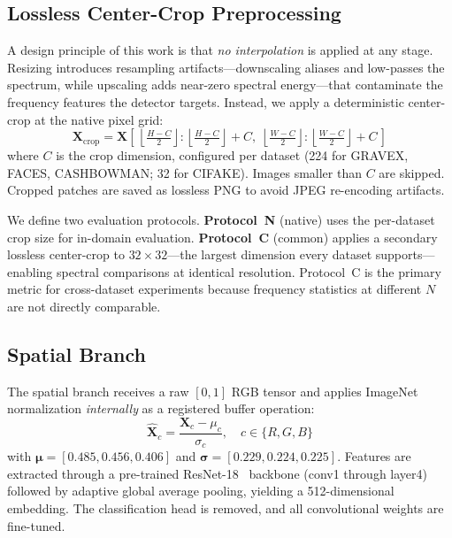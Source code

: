 \documentclass[conference]{IEEEtran}
\begin{document}
\subsection{Lossless Center-Crop Preprocessing}

A design principle of this work is that \emph{no interpolation} is applied at any stage. Resizing introduces resampling artifacts---downscaling aliases and low-passes the spectrum, while upscaling adds near-zero spectral energy---that contaminate the frequency features the detector targets. Instead, we apply a deterministic center-crop at the native pixel grid:
\begin{equation}
\label{eq:crop}
\mathbf{X}_{\text{crop}} = \mathbf{X}\!\left[\,\left\lfloor\tfrac{H-C}{2}\right\rfloor : \left\lfloor\tfrac{H-C}{2}\right\rfloor + C,\;\left\lfloor\tfrac{W-C}{2}\right\rfloor : \left\lfloor\tfrac{W-C}{2}\right\rfloor + C\,\right]
\end{equation}
where $C$ is the crop dimension, configured per dataset (224 for GRAVEX, FACES, CASHBOWMAN; 32 for CIFAKE). Images smaller than $C$ are skipped. Cropped patches are saved as lossless PNG to avoid JPEG re-encoding artifacts.

We define two evaluation protocols. \textbf{Protocol~N} (native) uses the per-dataset crop size for in-domain evaluation. \textbf{Protocol~C} (common) applies a secondary lossless center-crop to $32{\times}32$---the largest dimension every dataset supports---enabling spectral comparisons at identical resolution. Protocol~C is the primary metric for cross-dataset experiments because frequency statistics at different $N$ are not directly comparable.

\subsection{Spatial Branch}

The spatial branch receives a raw $[0, 1]$ RGB tensor and applies ImageNet normalization \emph{internally} as a registered buffer operation:
\begin{equation}
\label{eq:imagenet_norm}
\hat{\mathbf{X}}_c = \frac{\mathbf{X}_c - \mu_c}{\sigma_c}, \quad c \in \{R, G, B\}
\end{equation}
with $\boldsymbol{\mu} = [0.485, 0.456, 0.406]$ and $\boldsymbol{\sigma} = [0.229, 0.224, 0.225]$. Features are extracted through a pre-trained ResNet-18~\cite{he2016resnet} backbone (conv1 through layer4) followed by adaptive global average pooling, yielding a 512-dimensional embedding. The classification head is removed, and all convolutional weights are fine-tuned.
\end{document}
